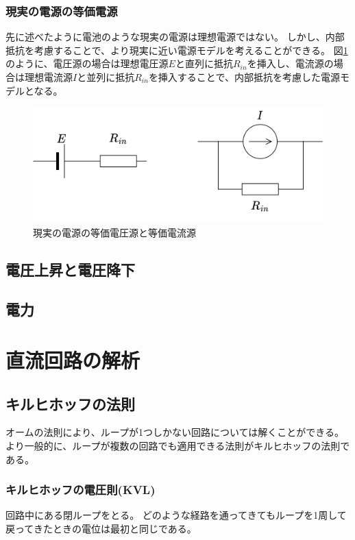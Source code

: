 \documentclass{ltjsreport}
\begin{document}
\subsubsection{現実の電源の等価電源}
先に述べたように電池のような現実の電源は理想電源ではない。
しかし、内部抵抗を考慮することで、より現実に近い電源モデルを考えることができる。
図\ref{fig:real_battery}のように、電圧源の場合は理想電圧源$E$と直列に抵抗$R_{in}$を挿入し、電流源の場合は理想電流源$I$と並列に抵抗$R_{in}$を挿入することで、内部抵抗を考慮した電源モデルとなる。
\begin{figure}[tb]
  \centering
  \includegraphics[keepaspectratio, scale=0.07]
       {img/real_battery.drawio.png}
  \caption{現実の電源の等価電圧源と等価電流源}
  \label{fig:real_battery}
 \end{figure}

\subsection{電圧上昇と電圧降下}


\subsection{電力}







\section{直流回路の解析}
\subsection{キルヒホッフの法則}
オームの法則により、ループが1つしかない回路については解くことができる。
より一般的に、ループが複数の回路でも適用できる法則がキルヒホッフの法則である。




\subsubsection{キルヒホッフの電圧則(KVL)}
回路中にある閉ループをとる。
どのような経路を通ってきてもループを1周して戻ってきたときの電位は最初と同じである。
\end{document}
